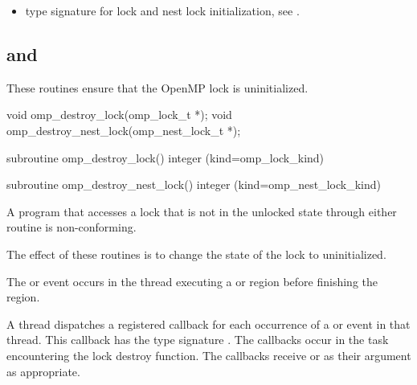 \crossreferences
\begin{itemize}
\item {} type signature for lock
  and nest lock initialization, see .
\end{itemize}



\subsection[\code{omp\_destroy\_lock} and \code{omp\_destroy\_nest\_lock}]{ and\\ }
\label{subsec:omp_destroy_lock and omp_destroy_nest_lock}
\summary
These routines ensure that the OpenMP lock is uninitialized.

\format
\ccppspecificstart
\begin{boxedcode}
void omp\_destroy\_lock(omp\_lock\_t *);
void omp\_destroy\_nest\_lock(omp\_nest\_lock\_t *);
\end{boxedcode}
\ccppspecificend

\fortranspecificstart
\begin{boxedcode}
subroutine omp\_destroy\_lock()
integer (kind=omp\_lock\_kind) 

subroutine omp\_destroy\_nest\_lock()
integer (kind=omp\_nest\_lock\_kind) 
\end{boxedcode}
\fortranspecificend

\constraints
A program that accesses a lock that is not in the unlocked state through either routine is 
non-conforming.

\effect
The effect of these routines is to change the state of the lock to uninitialized.

\events

The  or  event occurs in the thread 
executing a  or  region
before finishing the region.

\tools

A thread dispatches a registered 
callback for each occurrence of a  or  event 
in that thread.  This callback has the type signature .
The callbacks occur in the task encountering
the lock destroy function.  The callbacks receive  or 
  as their  argument as appropriate.


